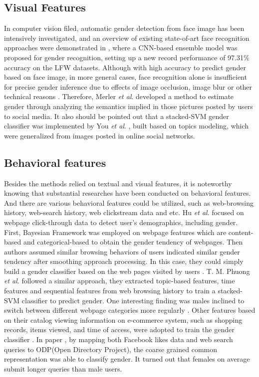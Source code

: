 \documentclass[runningheads]{llncs}
\begin{document}
	\subsection{Visual Features}
	
	In computer vision filed, automatic gender detection from face image has been intensively investigated, and an overview of existing state-of-art face recognition approaches were demonstrated in \cite{antipov2016minimalistic}, where a CNN-based ensemble model was proposed for gender recognition, setting up a new record performance of 97.31\% accuracy on the LFW datasets. Although with high accuracy to predict gender based on face image, in more general cases, face recognition alone is insufficient for precise gender inference due to effects of image occlusion, image blur or other technical reasons \cite{merler2015you}. Therefore, Merler \textit{et al}. developed a method to estimate gender through analyzing the semantics implied in those pictures posted by users to social media. It also should be pointed out that a stacked-SVM gender classifier was implemented by You \textit{et al}. \cite{you2014eyes}, built based on topics modeling, which were generalized from images posted in online social networks.
	 
	\subsection{Behavioral features}
	
	Besides the methods relied on textual and visual features, it is noteworthy knowing that substantial researches have been conducted on behavioral features. And there are various behavioral features could be utilized, such as web-browsing history, web-search history, web clickstream data and etc. Hu \textit{et al}. focused on webpage click-through data to detect user’s demographics, including gender. First, Bayesian Framework was employed on webpage features which are content-based and categorical-based to obtain the gender tendency of webpages. Then authors assumed similar browsing behaviors of users indicated similar gender tendency after smoothing approach processing. In this case, they could simply build a gender classifier based on the web pages visited by users \cite{hu2007demographic}. T. M. Phuong \textit{et al}. followed a similar approach, they extracted topic-based features, time features and sequential features from web browsing history to train a stacked-SVM classifier to predict gender. One interesting finding was males inclined to switch between different webpage categories more regularly \cite{phuong2014gender}. Other features based on their catalog viewing information on e-commerce system, such as shopping records, items viewed, and time of access, were adopted to train the gender classifier \cite{duong2016customer}. In paper \cite{bi2013inferring}, by mapping both Facebook likes data and web search queries to ODP(Open Directory Project), the coarse grained common representation was able to classify gender. It turned out that females on average submit longer queries than male users. 
	
\end{document}
